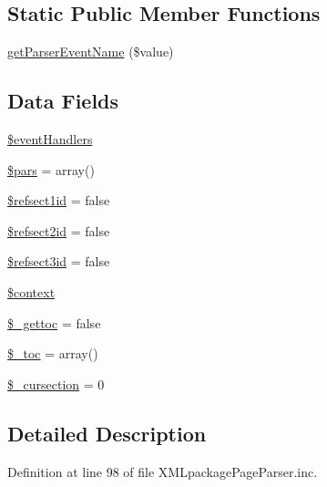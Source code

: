 \subsection*{\-Static \-Public \-Member \-Functions}
\begin{DoxyCompactItemize}
\item 
\hyperlink{class_x_m_l_package_page_parser_a9cc8a14f4bce21f0058f33036a2eb460}{get\-Parser\-Event\-Name} (\$value)
\end{DoxyCompactItemize}
\subsection*{\-Data \-Fields}
\begin{DoxyCompactItemize}
\item 
\hyperlink{class_x_m_l_package_page_parser_a430675102684e9ab820c7622678832b0}{\$event\-Handlers}
\item 
\hyperlink{class_x_m_l_package_page_parser_ab8117573961eab022362e6fa8622ee1c}{\$pars} = array()
\item 
\hyperlink{class_x_m_l_package_page_parser_ae4d6c02670a248fa43626873110fb716}{\$refsect1id} = false
\item 
\hyperlink{class_x_m_l_package_page_parser_a307830a525580e27cc0906de94743e13}{\$refsect2id} = false
\item 
\hyperlink{class_x_m_l_package_page_parser_ad3db9e63f8a3ade6c75cab99d441665e}{\$refsect3id} = false
\item 
\hyperlink{class_x_m_l_package_page_parser_ae05dedb802ada0155efdece2044fed64}{\$context}
\item 
\hyperlink{class_x_m_l_package_page_parser_aaf22fbb23ebd3d1734cbca6e8478f5e6}{\$\-\_\-gettoc} = false
\item 
\hyperlink{class_x_m_l_package_page_parser_a89239c7c6ac8aca36371eeec9753c130}{\$\-\_\-toc} = array()
\item 
\hyperlink{class_x_m_l_package_page_parser_a0cf7bdb874d70717622e82e05f89506d}{\$\-\_\-cursection} = 0
\end{DoxyCompactItemize}


\subsection{\-Detailed \-Description}


\-Definition at line 98 of file \-X\-M\-Lpackage\-Page\-Parser.\-inc.



